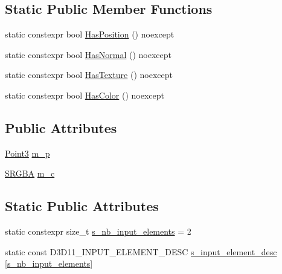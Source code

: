 \subsection*{Static Public Member Functions}
\begin{DoxyCompactItemize}
\item 
static constexpr bool \hyperlink{structmage_1_1_vertex_position_color_a254be63b468600a4a60639644d34086b}{Has\+Position} () noexcept
\item 
static constexpr bool \hyperlink{structmage_1_1_vertex_position_color_a53289aa86f3de21ba083d33dd18fafb8}{Has\+Normal} () noexcept
\item 
static constexpr bool \hyperlink{structmage_1_1_vertex_position_color_a34d7619b86890e49bd7678d333a50eef}{Has\+Texture} () noexcept
\item 
static constexpr bool \hyperlink{structmage_1_1_vertex_position_color_ae009d24a1a0fe1b60be9139c8ea62e5c}{Has\+Color} () noexcept
\end{DoxyCompactItemize}
\subsection*{Public Attributes}
\begin{DoxyCompactItemize}
\item 
\hyperlink{structmage_1_1_point3}{Point3} \hyperlink{structmage_1_1_vertex_position_color_a6438f99adc02bb094daa65c65d29133e}{m\+\_\+p}
\item 
\hyperlink{structmage_1_1_s_r_g_b_a}{S\+R\+G\+BA} \hyperlink{structmage_1_1_vertex_position_color_ace34e71c422b7cbff4c6b94ce61d852c}{m\+\_\+c}
\end{DoxyCompactItemize}
\subsection*{Static Public Attributes}
\begin{DoxyCompactItemize}
\item 
static constexpr size\+\_\+t \hyperlink{structmage_1_1_vertex_position_color_aca312c5c3837431ffa49cd3461426f96}{s\+\_\+nb\+\_\+input\+\_\+elements} = 2
\item 
static const D3\+D11\+\_\+\+I\+N\+P\+U\+T\+\_\+\+E\+L\+E\+M\+E\+N\+T\+\_\+\+D\+E\+SC \hyperlink{structmage_1_1_vertex_position_color_a0cc09950718850b64339c5fd5130ff9a}{s\+\_\+input\+\_\+element\+\_\+desc} \mbox{[}\hyperlink{structmage_1_1_vertex_position_color_aca312c5c3837431ffa49cd3461426f96}{s\+\_\+nb\+\_\+input\+\_\+elements}\mbox{]}
\end{DoxyCompactItemize}


